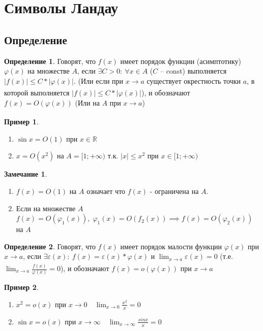 \documentclass[a4paper,oneside]{article}
\newcommand{\dslim}{\displaystyle\lim}
\newcommand{\R}{\mathbb{R}}
\newcommand{\eps}{\varepsilon}
\newcommand{\approach}[1]{\underset{#1}{\longrightarrow}}
\theoremstyle{definition}
\newtheorem{definition}{Определение}[subsection]
\theoremstyle{definition}
\newtheorem*{example}{Пример}
\theoremstyle{definition}
\newtheorem*{remark}{Замечание}
\begin{document}
\section{Символы Ландау}

\subsection{Определение}

\begin{definition}
    Говорят, что $f(x)$ имеет порядок функции (асимптотику) $ \varphi(x)$ на множестве $A$,
    если $\exists C > 0:\: \forall x \in A$ ($C$ -- const) выполняется
    $|f(x)| \le C*| \varphi(x)|$. (Или если при $x \approach{} a$ существует окрестность точки $a$, 
    в которой выполняется $|f(x)| \le C*| \varphi(x)|$), и обозначают $f(x) = O ( \varphi(x))$ 
    (Или на $A$ при $x \approach{} a$)
\end{definition}

\begin{example}
    \begin{enumerate}
        \item $\sin x = O(1)$ при $x \in \R$
        \item $x = O(x^2)$ на $A = [1; +\infty)$ т.к. $|x| \le x^2$ при $x \in [1; +\infty)$
    \end{enumerate}
\end{example}

\begin{remark}
    \begin{enumerate}
        \item $f(x) = O(1)$ на $A$ означает что $f(x)$ - ограничена на $A$.
        \item Если на множестве $A$ $f(x) = O( \varphi_1(x)), \;  \varphi_1(x) = O(f_2(x)) \implies f(x) = O ( \varphi_2(x))$ на $A$
    \end{enumerate}
\end{remark}

\begin{definition}
    Говорят, что $f(x)$ имеет порядок малости функции $ \varphi(x)$ при $x \approach{} a$, 
    если $\exists \eps(x):\: f(x) = \eps(x) *  \varphi(x)$ и $\dslim_{x \to a} \eps(x) = 0$ 
    (т.е. $\dslim_{x \to a} \frac{f(x)}{ \varphi(x)} = 0$), и обозначают 
    $f(x) = o( \varphi(x))$ при $x \approach{} a$
\end{definition}

\begin{example}
    \begin{enumerate}
        \item $x^2 = o(x)$ при $x \to 0 \quad \dslim_{x \to 0}  \frac{x^2}{x} = 0$
        \item $\sin x = o(x)$ при $x \to \infty \quad \dslim_{x \to \infty} \frac{sin x}{x} = 0$
    \end{enumerate}
\end{example}
\end{document}
